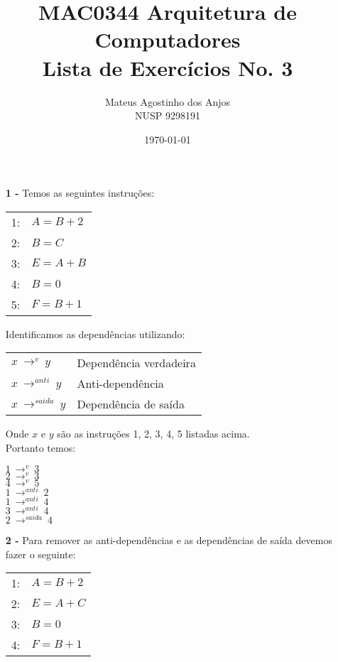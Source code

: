 \documentclass[12pt]{article}
\title{MAC0344 Arquitetura de Computadores\\
Lista de Exercícios No. 3
}
\author{Mateus Agostinho dos Anjos\\NUSP 9298191}
\date{\today}
\begin{document}
	\maketitle
	\begin{itemize}
		\item[\textbf{1 -}]
			\hfill\newline
			Temos as seguintes instruções:		
			\begin{center}
				\begin{tabular}{cl}
					1: & $A = B + 2$\\
					2: & $B = C$\\
					3: & $E = A + B$\\
					4: & $B = 0$\\
					5: & $F = B + 1$\\				
				\end{tabular}			
			\end{center}
			Identificamos as dependências utilizando:\\
			\begin{center}
				\begin{tabular}{ll}
			$x \ \longrightarrow^v \ y$ & Dependência verdadeira\\
			$x \ \longrightarrow^{anti} \ y$ & Anti-dependência\\
			$x \ \longrightarrow^{saida} \ y$ & Dependência de saída\\		
				\end{tabular}			
			\end{center}
			Onde $x$ e $y$ são as instruções {1, 2, 3, 4, 5} listadas
			acima.\\
			
			Portanto temos:\\
			\begin{center}
				$1 \ \longrightarrow^v \ 3$\\
				$2 \ \longrightarrow^v \ 3$\\
				$4 \ \longrightarrow^v \ 5$\\
				\hfill\newline
				$1 \ \longrightarrow^{anti} \ 2$\\
				$1 \ \longrightarrow^{anti} \ 4$\\
				$3 \ \longrightarrow^{anti} \ 4$\\
				\hfill\newline
				$2 \ \longrightarrow^{saida} \ 4$\\
			\end{center}
		\item[\textbf{2 -}]
			\hfill\newline
			Para remover as anti-dependências e as dependências de saída 
			devemos fazer o seguinte:
			\begin{center}
				\begin{tabular}{cl}
					1: & $A = B + 2$\\
					2: & $E = A + C$\\
					3: & $B = 0$\\
					4: & $F = B + 1$\\				
				\end{tabular}			
			\end{center}
	\end{itemize}
\end{document}
